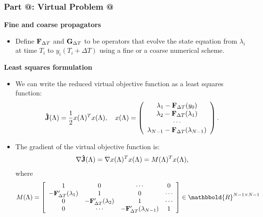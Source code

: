\documentclass[9pt]{beamer}
\makeatletter
\newcommand*{\rom}[1]{\expandafter\@slowromancap\romannumeral #1@}
\makeatother
\begin{document}
\begin{frame}
\frametitle{\textbf{ Part \rom{4}:} Virtual Problem \rom{1}}
\textbf{Fine and coarse propagators}
\begin{itemize}
\item{Define $\bold{F}_{\Delta T}$ and $\bold{G}_{\Delta T}$ to be operators that evolve the state equation from $\lambda_i$ at time $T_{i}$ to $y_i(T_{i}+\Delta T)$ using a fine or a coarse numerical scheme. }
\end{itemize}
\textbf{Least squares formulation}
\begin{itemize}
\item{We can write the reduced virtual objective function as a least squares function:
{\small
\begin{align*}
\bold{ \hat J}(\Lambda) = \frac{1}{2} x(\Lambda)^Tx(\Lambda),\quad
x(\Lambda)=\left( \begin{array}{c}  
   \lambda_1 - \bold F_{\Delta T}(y_0) \\ 
   \lambda_2 - \bold F_{\Delta T}(\lambda_1) \\
   \cdots  \\
   \lambda_{N-1} -\bold F_{\Delta T}(\lambda_{N-1}) \\
   \end{array}  \right).
\end{align*}}}
\item{The gradient of the virtual objective function is:
{\small
\begin{align*}
\nabla \bold{\hat J}(\Lambda)= \nabla x(\Lambda)^T x(\Lambda) = M(\Lambda)^Tx(\Lambda),
\end{align*}}
where 
{\small
\begin{align*}
M(\Lambda)= \left[ \begin{array}{cccc}
   1 & 0 & \cdots & 0 \\  
   -\bold{F}_{\Delta T}'(\lambda_{1}) & 1 & 0 & \cdots \\ 
   0 &-\bold{F}_{\Delta T}'(\lambda_{2}) & 1  & \cdots \\
   0 &\cdots &-\bold{F}_{\Delta T}'(\lambda_{N-1}) & 1  \\
   \end{array}  \right]\in\mathbbold{R}^{N-1\times N-1}
\end{align*}}}
\end{itemize}
\end{frame}
\end{document}
